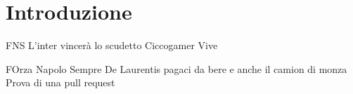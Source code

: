 \chapter*{Introduzione}
FNS
L'inter vincerà lo scudetto
Ciccogamer Vive

FOrza Napolo Sempre
De Laurentis pagaci da bere e anche il camion di monza
Prova di una pull request